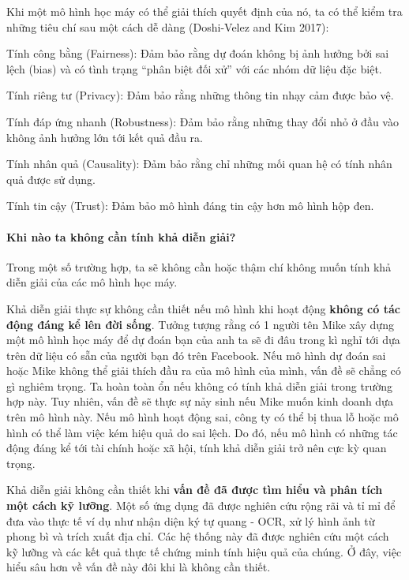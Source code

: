 Khi một mô hình học máy có thể giải thích quyết định của nó, ta có thể kiểm tra những tiêu chí sau một cách dễ dàng (Doshi-Velez and Kim 2017):

\begin{packed_enum}
    \item Tính công bằng (Fairness): Đảm bảo rằng dự đoán không bị ảnh hưởng bởi sai lệch (bias) và có tình trạng ``phân biệt đối xử'' với các nhóm dữ liệu đặc biệt.
    \item Tính riêng tư (Privacy): Đảm bảo rằng những thông tin nhạy cảm được bảo vệ.
    \item Tính đáp ứng nhanh (Robustness): Đảm bảo rằng những thay đổi nhỏ ở đầu vào không ảnh hưởng lớn tới kết quả đầu ra.
    \item Tính nhân quả (Causality): Đảm bảo rằng chỉ những mối quan hệ có tính nhân quả được sử dụng.
    \item Tính tin cậy (Trust): Đảm bảo mô hình đáng tin cậy hơn mô hình hộp đen.
\end{packed_enum}

\paragraph{Khi nào ta không cần tính khả diễn giải?}

Trong một số trường hợp, ta sẽ không cần hoặc thậm chí không muốn tính khả diễn giải của các mô hình học máy.

Khả diễn giải thực sự không cần thiết nếu mô hình khi hoạt động \textbf{không có tác động đáng kể lên đời sống}. Tưởng tượng rằng có 1 người tên Mike xây dựng một mô hình học máy để dự đoán bạn của anh ta sẽ đi đâu trong kì nghỉ tới dựa trên dữ liệu có sẵn của người bạn đó trên Facebook. Nếu mô hình dự đoán sai hoặc Mike không thể giải thích đầu ra của mô hình của mình, vấn đề sẽ chẳng có gì nghiêm trọng. Ta hoàn toàn ổn nếu không có tính khả diễn giải trong trường hợp này. Tuy nhiên, vấn đề sẽ thực sự nảy sinh nếu Mike muốn kinh doanh dựa trên mô hình này. Nếu mô hình hoạt động sai, công ty có thể bị thua lỗ hoặc mô hình có thể làm việc kém hiệu quả do sai lệch. Do đó, nếu mô hình có những tác động đáng kể tới tài chính hoặc xã hội, tính khả diễn giải trở nên cực kỳ quan trọng.

Khả diễn giải không cần thiết khi \textbf{vấn đề đã được tìm hiểu và phân tích một cách kỹ lưỡng}. 
Một số ứng dụng đã được nghiên cứu rộng rãi và tỉ mỉ để đưa vào thực tế ví dụ như nhận diện ký tự quang - OCR, xử lý hình ảnh từ phong bì và trích xuất địa chỉ. Các hệ thống này đã được nghiên cứu một cách kỹ lưỡng và các kết quả thực tế chứng minh tính hiệu quả của chúng. Ở đây, việc hiểu sâu hơn về vấn đề này đôi khi là không cần thiết.


